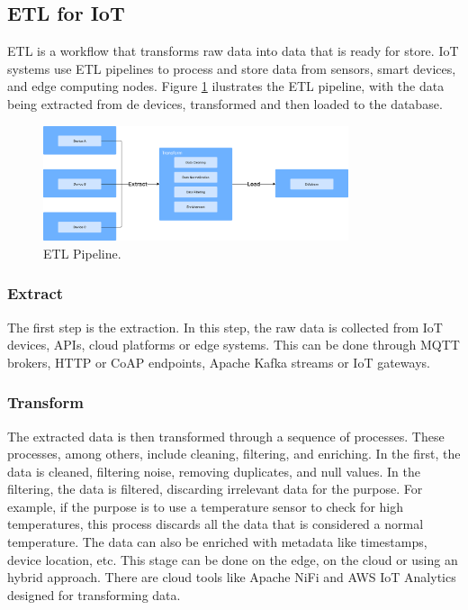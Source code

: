 \subsection{ETL for IoT}
\gls{ETL} is a workflow that transforms raw data into data that is ready for
store. \gls{IoT} systems use \gls{ETL} pipelines to process and store data from sensors,
smart devices, and edge computing nodes. Figure \ref{fig:etl:pipeline}
ilustrates the \gls{ETL} pipeline, with the data being extracted from de devices,
transformed and then loaded to the database.

\begin{figure}[htbp]
	\centering
	\includegraphics[width=0.8\textwidth, height=0.5\textheight, keepaspectratio]{Chapters/Figures/ETL/ETL.pdf}
	\caption{\gls{ETL} Pipeline.}
	\label{fig:etl:pipeline}
\end{figure}

\subsubsection{Extract}
The first step is the extraction. In this step, the raw data is collected from
\gls{IoT} devices, \gls{API}s, cloud platforms or edge systems. This can be done through
\gls{MQTT} brokers, \gls{HTTP} or \gls{CoAP} endpoints, Apache Kafka streams or \gls{IoT} gateways.

\subsubsection{Transform}
The extracted data is then transformed through a sequence of processes. These
processes, among others, include cleaning, filtering, and enriching.
In the first, the data is cleaned, filtering noise, removing duplicates, and
null values. In the filtering, the data is filtered, discarding irrelevant data
for the purpose. For example, if the purpose is to use a temperature sensor to
check for high temperatures, this process discards all the data that is
considered a normal temperature. The data can also be enriched with metadata
like timestamps, device location, etc. This stage can be done on the edge, on
the cloud or using an hybrid approach. There are cloud tools like Apache NiFi
and \gls{AWS} \gls{IoT} Analytics designed for transforming data.

